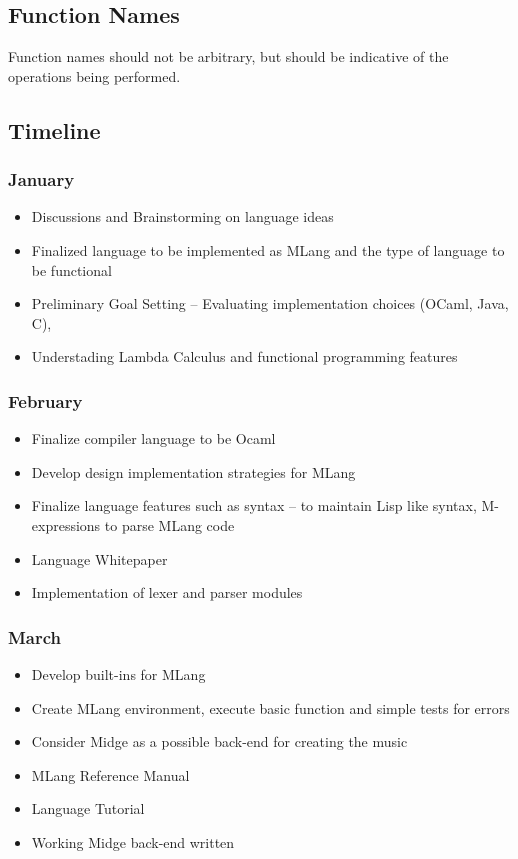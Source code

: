 \documentclass[letterpaper,11pt]{article}
\begin{document}
{\subsection{Function Names}
Function names should not be arbitrary, but should be indicative of the operations being performed.

\subsection{Timeline}

\subsubsection{January}

\begin{itemize}
\item Discussions and Brainstorming on language ideas
\item Finalized language to be implemented as MLang and the type of language to be functional
\item Preliminary Goal Setting – Evaluating implementation choices (OCaml, Java, C),
\item Understading Lambda Calculus and functional programming features
    \end{itemize}

\subsubsection{February}

\begin{itemize}
\item Finalize compiler language to be Ocaml	
\item Develop design implementation strategies for MLang
\item Finalize language features such as syntax – to maintain Lisp like syntax, M-expressions to parse MLang code
\item Language Whitepaper
\item Implementation of lexer and parser modules

    \end{itemize}
\subsubsection{March}

\begin{itemize}
\item Develop built-ins for MLang
\item Create MLang environment, execute basic function and simple tests for errors
\item Consider Midge as a possible back-end for creating the music
\item MLang Reference Manual
\item Language Tutorial
\item Working Midge back-end written


\end{itemize}}
\end{document}
